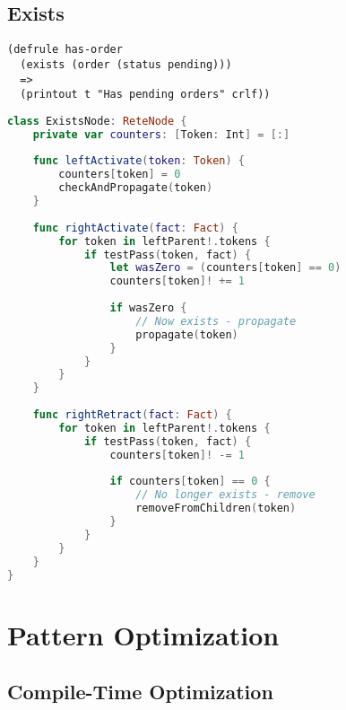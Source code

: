 \subsection{Exists}

\begin{lstlisting}[language=CLIPS]
(defrule has-order
  (exists (order (status pending)))
  =>
  (printout t "Has pending orders" crlf))
\end{lstlisting}

\begin{lstlisting}[language=Swift]
class ExistsNode: ReteNode {
    private var counters: [Token: Int] = [:]
    
    func leftActivate(token: Token) {
        counters[token] = 0
        checkAndPropagate(token)
    }
    
    func rightActivate(fact: Fact) {
        for token in leftParent!.tokens {
            if testPass(token, fact) {
                let wasZero = (counters[token] == 0)
                counters[token]! += 1
                
                if wasZero {
                    // Now exists - propagate
                    propagate(token)
                }
            }
        }
    }
    
    func rightRetract(fact: Fact) {
        for token in leftParent!.tokens {
            if testPass(token, fact) {
                counters[token]! -= 1
                
                if counters[token] == 0 {
                    // No longer exists - remove
                    removeFromChildren(token)
                }
            }
        }
    }
}
\end{lstlisting}

\section{Pattern Optimization}

\subsection{Compile-Time Optimization}

